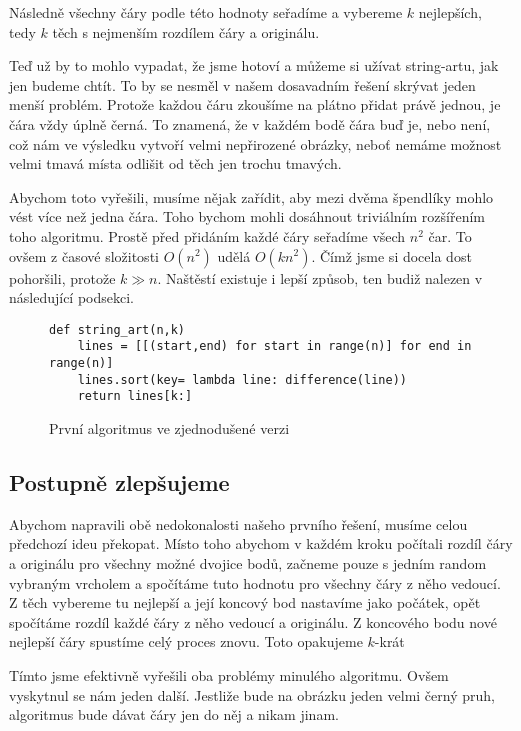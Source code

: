 \documentclass{article}
\begin{document}
Následně všechny čáry podle této hodnoty seřadíme a vybereme $k$ nejlepších, 
tedy $k$ těch s nejmenším rozdílem čáry a originálu.

Teď už by to mohlo vypadat, že jsme hotoví a můžeme si užívat string-artu, jak
jen budeme chtít. To by se nesměl v našem dosavadním řešení skrývat jeden menší
problém. Protože každou čáru zkoušíme na plátno přidat právě jednou, je čára vždy
úplně černá. To znamená, že v každém bodě čára buď je, nebo není, což nám ve
výsledku vytvoří velmi nepřirozené obrázky, neboť nemáme možnost velmi tmavá místa
odlišit od těch jen trochu tmavých.

Abychom toto vyřešili, musíme nějak zařídit, aby mezi dvěma špendlíky mohlo vést
více než jedna čára. Toho bychom mohli dosáhnout triviálním rozšířením toho
algoritmu. Prostě před přidáním každé čáry seřadíme všech $n^2$ čar. To ovšem z
časové složitosti $O(n^2)$ udělá $O(kn^2)$. Čímž jsme si docela dost pohoršili,
protože $k \gg n$. Naštěstí existuje i lepší způsob, ten budiž nalezen v
následující podsekci.


\begin{figure}[!ht]
 \label{fig:first}
\begin{mdframed}[style=MyFrame]
\begin{lstlisting}[style=metoo]
def string_art(n,k)
    lines = [[(start,end) for start in range(n)] for end in range(n)]
    lines.sort(key= lambda line: difference(line))
    return lines[k:]
 \end{lstlisting}
\end{mdframed}
\caption{První algoritmus ve zjednodušené verzi}
\end{figure}

\subsection{Postupně zlepšujeme}
\label{ssec:postupne-zlepsujeme}

Abychom napravili obě nedokonalosti našeho prvního řešení, musíme celou předchozí
ideu překopat. Místo toho abychom v každém kroku počítali rozdíl čáry a originálu 
pro všechny možné dvojice bodů, začneme pouze s jedním random vybraným vrcholem a 
spočítáme tuto hodnotu pro všechny čáry z něho vedoucí. Z těch vybereme tu nejlepší
a její koncový bod nastavíme jako počátek, opět spočítáme rozdíl každé čáry z něho
vedoucí a originálu. Z koncového bodu nové nejlepší čáry spustíme celý proces znovu.
Toto opakujeme $k$-krát 

Tímto jsme efektivně vyřešili oba problémy minulého
algoritmu. Ovšem vyskytnul se nám jeden další. Jestliže bude na obrázku jeden
velmi černý pruh, algoritmus bude dávat čáry jen do něj a nikam jinam. 
\end{document}
